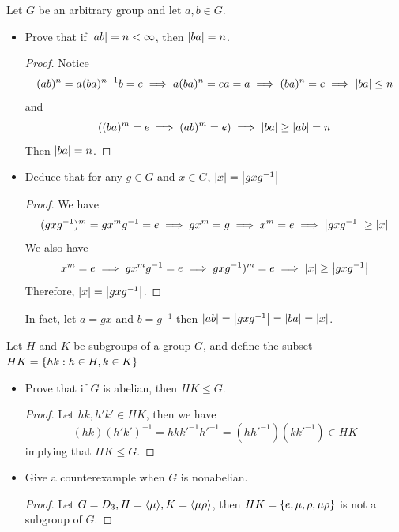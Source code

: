 \documentclass[12pt,a4paper]{article}
\begin{document}
    \begin{ex}
        Let $G$ be an arbitrary group and let $a,b\in G$.
        \begin{itemize}
            \item Prove that if $\left\lvert ab \right\rvert=n<\infty$, then $\left\lvert ba \right\rvert=n$.
            \begin{proof}
                Notice
                \[
                    (ab)^n=a(ba)^{n-1}b=e\implies a(ba)^{n}=ea=a\implies (ba)^{n}=e\implies \left\lvert ba \right\rvert\leq n
                \]
                and
                \[
                    ((ba)^m=e\implies (ab)^m=e)\implies \left\lvert ba \right\rvert\geq\left\lvert ab \right\rvert=n
                \]
                Then $\left\lvert ba \right\rvert=n$.
            \end{proof}
            \item Deduce that for any $g\in G$ and $x\in G$, $\left\lvert x \right\rvert=\left\lvert gxg^{-1} \right\rvert$
            \begin{proof}
                We have
                \[
                    (gxg^{-1})^m=gx^mg^{-1}=e\implies gx^m=g\implies x^m=e\implies \left\lvert gxg^{-1} \right\rvert\geq\left\lvert x \right\rvert
                \]
                We also have
                \[
                    x^m=e\implies gx^mg^{-1}=e\implies gxg^{-1})^m=e\implies \left\lvert x \right\rvert\geq\left\lvert gxg^{-1} \right\rvert
                \]
                Therefore, $\left\lvert x \right\rvert=\left\lvert gxg^{-1} \right\rvert$.
            \end{proof}
            \begin{remark}
                In fact, let $a=gx$ and $b=g^{-1}$ then $\left\lvert ab \right\rvert=\left\lvert gxg^{-1} \right\rvert=\left\lvert ba \right\rvert=\left\lvert x \right\rvert$.
            \end{remark}
        \end{itemize}
    \end{ex}
    \bigskip

    \begin{ex}
        Let $H$ and $K$ be subgroups of a group $G$, and define the subset $HK=\left\{ hk:h\in H,k\in K \right\}$
        \begin{itemize}
            \item Prove that if $G$ is abelian, then $HK\leq G$.
            \begin{proof}
                Let $hk,h'k'\in HK$, then we have
                \[
                    (hk)(h'k')^{-1}=hkk'^{-1}h'^{-1}=(hh'^{-1})(kk'^{-1})\in HK
                \]
                implying that $HK\leq G$.
            \end{proof}
            \item Give a counterexample when $G$ is nonabelian.
            \begin{proof}
                Let $G=D_3,H=\langle \mu \rangle,K=\langle \mu\rho \rangle$, then $HK=\left\{ e,\mu,\rho,\mu\rho \right\}$ is not a subgroup of $G$.
            \end{proof}
        \end{itemize}
    \end{ex}
    \bigskip
\end{document}
